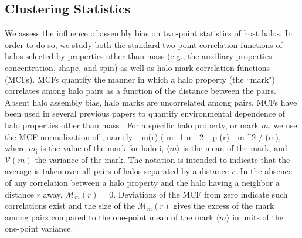 \documentclass[usenatbib,usegraphicx,letterpaper]{mn2e}
\begin{document}

\subsection{Clustering Statistics}

We assess the influence of assembly bias on two-point statistics of host halos. In order to do so, we 
study both the standard two-point correlation functions of halos selected by properties other than mass 
(e.g., the auxiliary properties concentration, shape, and spin) as well as halo mark correlation functions
(MCFs). MCFs quantify the manner in which a halo property (the ``mark") correlates among halo pairs as a function
of the distance between the pairs. Absent halo assembly bias, halo marks are uncorrelated among pairs. 
MCFs have been used in several previous papers to quantify environmental dependence of halo 
properties other than mass \citep{sheth04, harker06, wechsler06, mao15} . 
For a specific halo property, or mark $m$, we use the MCF normalization of \citet{wechsler06}, namely 
\beq
{}_m(r) \equiv ( \langle m_1 m_2 \rangle_p (r) - \langle m \rangle^2 / (m),
\eeq
where $m_{\mathrm{i}}$ is the value of the mark for halo $\mathrm{i}$, $\langle m \rangle$ is the mean of the
mark, and $\mathcal{V}(m)$ the variance of the mark. The notation is intended to indicate that the average is
taken over all pairs of halos separated by a distance $r$. In the absence of any correlation between a halo
property and the halo having a neighbor a distance $r$ away, $\mathcal{M}_m(r) = 0$. Deviations of the MCF from
zero indicate such correlations exist and the size of the $\mathcal{M}_m(r)$ gives the excess of the mark among
pairs compared to the one-point mean of the mark $\langle m\rangle$ in units of the one-point variance.
\end{document}
